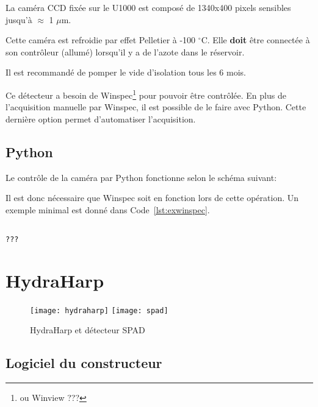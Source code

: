 \documentclass[11pt,francais]{book} %
\begin{document}
La caméra CCD fixée sur le U1000 est composé de 1340x400 pixels sensibles jusqu'à $\approx$ 1 $\mu$m.

Cette caméra est refroidie par effet Pelletier à -100 $^{\circ}$C.
Elle {\bf doit} être connectée à son contrôleur (allumé) lorsqu'il y a de l'azote dans le réservoir.

Il est recommandé de pomper le vide d'isolation tous les 6 mois.

Ce détecteur a besoin de Winspec\footnote{ou Winview ???} pour pouvoir être contrôlée.
En plus de l'acquisition manuelle par Winspec, il est possible de le faire avec Python.
Cette dernière option permet d'automatiser l'acquisition.

\subsection{Python}

Le contrôle de la caméra par Python fonctionne selon le schéma suivant: 
\begin{center}
\end{center}

Il est donc nécessaire que Winspec soit en fonction lors de cette opération.
Un exemple minimal est donné dans Code~\ref{lst:exwinspec}.

\begin{lstlisting}[frame=single,caption={Exemple d'utilisation de Winspec avec Python},label={lst:exwinspec},breaklines=true,]  % Start your code-block

???
\end{lstlisting}


\section{HydraHarp}

\begin{figure}[h]
  \centering\texttt{[image: hydraharp]}
  \centering\texttt{[image: spad]}
  \caption{HydraHarp et détecteur SPAD}
  \label{fig:hydraharp}
\end{figure}

\subsection{Logiciel du constructeur}
\end{document}
